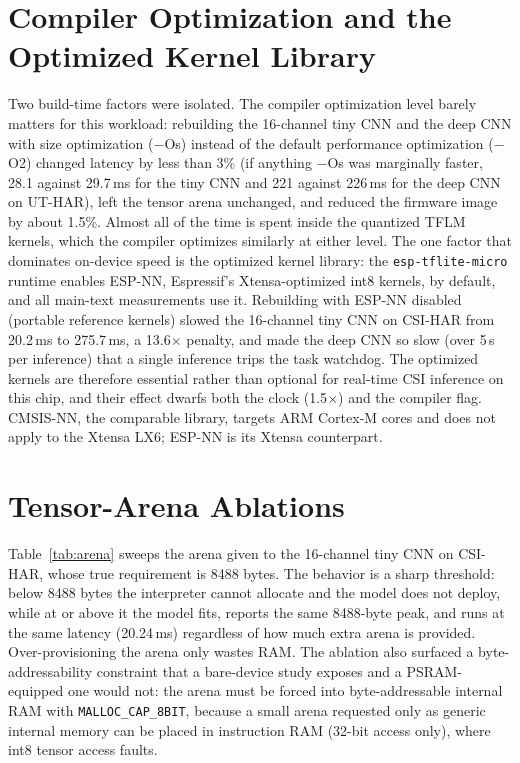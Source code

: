 \documentclass[10pt,journal,twocolumn]{IEEEtran}
\begin{document}
\section{Compiler Optimization and the Optimized Kernel Library}
Two build-time factors were isolated. The compiler optimization level barely matters for this workload: rebuilding the 16-channel tiny CNN and the deep CNN with size optimization ($-$Os) instead of the default performance optimization ($-$O2) changed latency by less than 3\% (if anything $-$Os was marginally faster, 28.1 against 29.7\,ms for the tiny CNN and 221 against 226\,ms for the deep CNN on UT-HAR), left the tensor arena unchanged, and reduced the firmware image by about 1.5\%. Almost all of the time is spent inside the quantized TFLM kernels, which the compiler optimizes similarly at either level. The one factor that dominates on-device speed is the optimized kernel library: the \texttt{esp-tflite-micro} runtime enables ESP-NN, Espressif's Xtensa-optimized int8 kernels, by default, and all main-text measurements use it. Rebuilding with ESP-NN disabled (portable reference kernels) slowed the 16-channel tiny CNN on CSI-HAR from 20.2\,ms to 275.7\,ms, a 13.6$\times$ penalty, and made the deep CNN so slow (over 5\,s per inference) that a single inference trips the task watchdog. The optimized kernels are therefore essential rather than optional for real-time CSI inference on this chip, and their effect dwarfs both the clock (1.5$\times$) and the compiler flag. CMSIS-NN, the comparable library, targets ARM Cortex-M cores and does not apply to the Xtensa LX6; ESP-NN is its Xtensa counterpart.

\section{Tensor-Arena Ablations}
Table~\ref{tab:arena} sweeps the arena given to the 16-channel tiny CNN on CSI-HAR, whose true requirement is 8488 bytes. The behavior is a sharp threshold: below 8488 bytes the interpreter cannot allocate and the model does not deploy, while at or above it the model fits, reports the same 8488-byte peak, and runs at the same latency (20.24\,ms) regardless of how much extra arena is provided. Over-provisioning the arena only wastes RAM. The ablation also surfaced a byte-addressability constraint that a bare-device study exposes and a PSRAM-equipped one would not: the arena must be forced into byte-addressable internal RAM with \texttt{MALLOC\_CAP\_8BIT}, because a small arena requested only as generic internal memory can be placed in instruction RAM (32-bit access only), where int8 tensor access faults.
\end{document}
